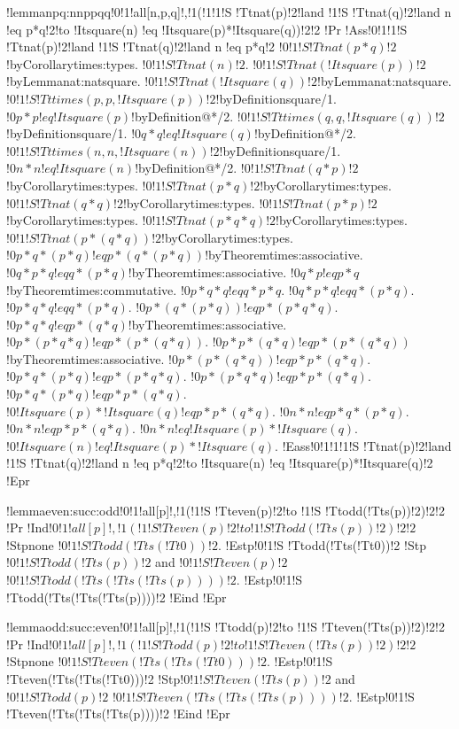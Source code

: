 !lemma{npq:nnppqq}{!0!1!all[n,p,q]!,!1(!1!1!S !Tt{nat}(p)!2!land !1!S !Tt{nat}(q)!2!land n !eq p*q!2!to !It{square}(n) !eq !It{square}(p)*!It{square}(q))!2!2}
!Pr{
!Ass{!0!1!1!S !Tt{nat}(p)!2!land !1!S !Tt{nat}(q)!2!land n !eq p*q!2}
$!0!1!S !Tt{nat}(p*q)!2$!by{Corollary}{times:types}.
$!0!1!S !Tt{nat}(n)!2$.
$!0!1!S !Tt{nat}(!It{square}(p))!2$!by{Lemma}{nat:natsquare}.
$!0!1!S !Tt{nat}(!It{square}(q))!2$!by{Lemma}{nat:natsquare}.
$!0!1!S !Tt{times}(p,p,!It{square}(p))!2$!by{Definition}{square/1}.
$!0p*p !eq !It{square}(p)$!by{Definition}{@*/2}.
$!0!1!S !Tt{times}(q,q,!It{square}(q))!2$!by{Definition}{square/1}.
$!0q*q !eq !It{square}(q)$!by{Definition}{@*/2}.
$!0!1!S !Tt{times}(n,n,!It{square}(n))!2$!by{Definition}{square/1}.
$!0n*n !eq !It{square}(n)$!by{Definition}{@*/2}.
$!0!1!S !Tt{nat}(q*p)!2$!by{Corollary}{times:types}.
$!0!1!S !Tt{nat}(p*q)!2$!by{Corollary}{times:types}.
$!0!1!S !Tt{nat}(q*q)!2$!by{Corollary}{times:types}.
$!0!1!S !Tt{nat}(p*p)!2$!by{Corollary}{times:types}.
$!0!1!S !Tt{nat}(p*q*q)!2$!by{Corollary}{times:types}.
$!0!1!S !Tt{nat}(p*(q*q))!2$!by{Corollary}{times:types}.
$!0p*q*(p*q) !eq p*(q*(p*q))$!by{Theorem}{times:associative}.
$!0q*p*q !eq q*(p*q)$!by{Theorem}{times:associative}.
$!0q*p !eq p*q$!by{Theorem}{times:commutative}.
$!0p*q*q !eq q*p*q$.
$!0q*p*q !eq q*(p*q)$.
$!0p*q*q !eq q*(p*q)$.
$!0p*(q*(p*q)) !eq p*(p*q*q)$.
$!0p*q*q !eq p*(q*q)$!by{Theorem}{times:associative}.
$!0p*(p*q*q) !eq p*(p*(q*q))$.
$!0p*p*(q*q) !eq p*(p*(q*q))$!by{Theorem}{times:associative}.
$!0p*(p*(q*q)) !eq p*p*(q*q)$.
$!0p*q*(p*q) !eq p*(p*q*q)$.
$!0p*(p*q*q) !eq p*p*(q*q)$.
$!0p*q*(p*q) !eq p*p*(q*q)$.
$!0!It{square}(p)*!It{square}(q) !eq p*p*(q*q)$.
$!0n*n !eq p*q*(p*q)$.
$!0n*n !eq p*p*(q*q)$.
$!0n*n !eq !It{square}(p)*!It{square}(q)$.
$!0!It{square}(n) !eq !It{square}(p)*!It{square}(q)$.
!Eass{!0!1!1!1!S !Tt{nat}(p)!2!land !1!S !Tt{nat}(q)!2!land n !eq p*q!2!to !It{square}(n) !eq !It{square}(p)*!It{square}(q)!2}}
!Epr

!lemma{even:succ:odd}{!0!1!all[p]!,!1(!1!S !Tt{even}(p)!2!to !1!S !Tt{odd}(!Tt{s}(p))!2)!2!2}
!Pr{
!Ind{$!0!1!all[p]!,!1(!1!S !Tt{even}(p)!2!to !1!S !Tt{odd}(!Tt{s}(p))!2)!2!2$}
!Stp{none}
$!0!1!S !Tt{odd}(!Tt{s}(!Tt{0}))!2$.
!Estp{!0!1!S !Tt{odd}(!Tt{s}(!Tt{0}))!2}
!Stp{$!0!1!S !Tt{odd}(!Tt{s}(p))!2$ and $!0!1!S !Tt{even}(p)!2$}
$!0!1!S !Tt{odd}(!Tt{s}(!Tt{s}(!Tt{s}(p))))!2$.
!Estp{!0!1!S !Tt{odd}(!Tt{s}(!Tt{s}(!Tt{s}(p))))!2}
!Eind}
!Epr

!lemma{odd:succ:even}{!0!1!all[p]!,!1(!1!S !Tt{odd}(p)!2!to !1!S !Tt{even}(!Tt{s}(p))!2)!2!2}
!Pr{
!Ind{$!0!1!all[p]!,!1(!1!S !Tt{odd}(p)!2!to !1!S !Tt{even}(!Tt{s}(p))!2)!2!2$}
!Stp{none}
$!0!1!S !Tt{even}(!Tt{s}(!Tt{s}(!Tt{0})))!2$.
!Estp{!0!1!S !Tt{even}(!Tt{s}(!Tt{s}(!Tt{0})))!2}
!Stp{$!0!1!S !Tt{even}(!Tt{s}(p))!2$ and $!0!1!S !Tt{odd}(p)!2$}
$!0!1!S !Tt{even}(!Tt{s}(!Tt{s}(!Tt{s}(p))))!2$.
!Estp{!0!1!S !Tt{even}(!Tt{s}(!Tt{s}(!Tt{s}(p))))!2}
!Eind}
!Epr

